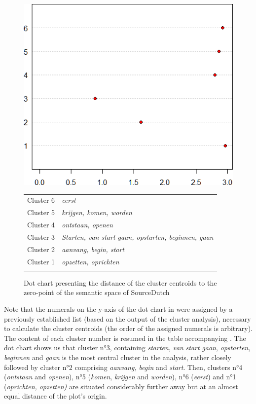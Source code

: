\begin{figure} 
\includegraphics[height=.4\textheight]{figures/Vandevoorde2-img55.png}\vspace*{\baselineskip}
\scriptsize
\begin{tabular}{l>{\itshape}l}
\lsptoprule
Cluster 6 & eerst\\
Cluster 5 & krijgen{\normalfont,} komen{\normalfont,} worden\\
Cluster 4 & ontstaan{\normalfont,} openen\\
Cluster 3 & Starten{\normalfont,} van start gaan{\normalfont,} opstarten{\normalfont,} beginnen{\normalfont,} gaan\\
Cluster 2 & aanvang{\normalfont,} begin{\normalfont,} start\\
Cluster 1 & opzetten{\normalfont,} oprichten\\
\lspbottomrule
\end{tabular}
\normalsize
\caption{\label{fig:4:55}Dot chart presenting the distance of the cluster centroids to the zero-point of the semantic space of SourceDutch}
\end{figure}

Note that the numerals on the y-axis of the dot chart in  were assigned by a previously established list (based on the output of the cluster analysis), necessary to calculate the cluster centroids (the order of the assigned numerals is arbitrary). The content of each cluster number is resumed in the table accompanying . The dot chart shows us that cluster n°3, containing \textit{starten}, \textit{van} \textit{start} \textit{gaan}, \textit{opstarten}, \textit{beginnen} and \textit{gaan} is the most central cluster in the analysis, rather closely followed by cluster n°2 comprising \textit{aanvang,} \textit{begin} and \textit{start}. Then, clusters n°4 (\textit{ontstaan} and \textit{openen}), n°5 (\textit{komen}, \textit{krijgen} and \textit{worden}), n°6 (\textit{eerst}) and n°1 (\textit{oprichten,} \textit{opzetten)} are situated considerably further away but at an almost equal distance of the plot’s origin.

